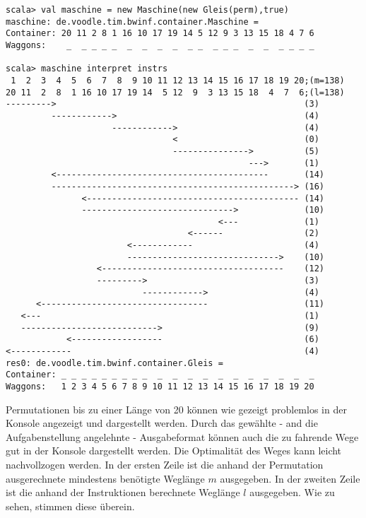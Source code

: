 \begin{lstlisting}
scala> val maschine = new Maschine(new Gleis(perm),true)      
maschine: de.voodle.tim.bwinf.container.Maschine = 
Container: 20 11 2 8 1 16 10 17 19 14 5 12 9 3 13 15 18 4 7 6
Waggons:    _  _ _ _ _  _  _  _  _  _ _  _ _ _  _  _  _ _ _ _

scala> maschine interpret instrs
 1  2  3  4  5  6  7  8  9 10 11 12 13 14 15 16 17 18 19 20;(m=138)
20 11  2  8  1 16 10 17 19 14  5 12  9  3 13 15 18  4  7  6;(l=138)
--------->                                                 (3)
         ------------>                                     (4)
                     ------------>                         (4)
                                 <                         (0)
                                 --------------->          (5)
                                                --->       (1)
         <------------------------------------------       (14)
         ------------------------------------------------> (16)
               <------------------------------------------ (14)
               ------------------------------>             (10)
                                          <---             (1)
                                    <------                (2)
                        <------------                      (4)
                        ------------------------------>    (10)
                  <------------------------------------    (12)
                  --------->                               (3)
                           ------------>                   (4)
      <---------------------------------                   (11)
   <---                                                    (1)
   --------------------------->                            (9)
            <------------------                            (6)
<------------                                              (4)
res0: de.voodle.tim.bwinf.container.Gleis = 
Container: _ _ _ _ _ _ _ _ _  _  _  _  _  _  _  _  _  _  _  _
Waggons:   1 2 3 4 5 6 7 8 9 10 11 12 13 14 15 16 17 18 19 20
\end{lstlisting}
\lstset{basicstyle=\ttfamily\normalsize}
Permutationen bis zu einer Länge von 20 können wie gezeigt problemlos in der Konsole angezeigt und dargestellt werden.
Durch das gewählte - and die Aufgabenstellung angelehnte - Ausgabeformat können auch die zu fahrende Wege gut in der Konsole dargestellt werden.
Die Optimalität des Weges kann leicht nachvollzogen werden.
In der ersten Zeile ist die anhand der Permutation ausgerechnete mindestens benötigte Weglänge $m$ ausgegeben.
In der zweiten Zeile ist die anhand der Instruktionen berechnete Weglänge $l$ ausgegeben. Wie zu sehen, stimmen diese überein.
